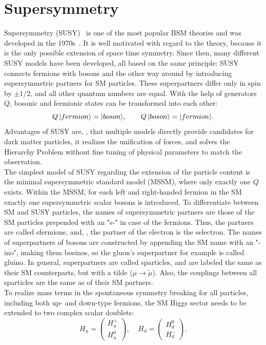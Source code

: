 \section{Supersymmetry}\label{sec:SUSY}
Supersymmetry (SUSY)~\cite{SUSYOriginal,SUSYPrimer} is one of the most popular BSM theories and was developed in the 1970s~\cite{SUSYTheorem,HAAG1975257}. It is well motivated with regard to the theory, because it is the only possible extension of space time symmetry. Since then, many different SUSY models have been developed, all based on the same principle: SUSY connects fermions with bosons and the other way around by introducing supersymmetric partners for SM particles. These superpartners differ only in spin by $\pm1/2$, and all other quantum numbers are equal. With the help of generators $Q$, bosonic and fermionic states can be transformed into each other:
\begin{equation}
 Q\,\lvert fermion\rangle=\lvert boson\rangle,~~~~~~ Q\,\lvert boson\rangle=\lvert fermion\rangle.
\end{equation}
Advantages of SUSY are, \eg, that multiple models directly provide candidates for dark matter particles, it realizes the unification of forces, and solves the Hierarchy Problem without fine tuning of physical parameters to match the observation.\\
The simplest model of SUSY regarding the extension of the particle content is the minimal supersymmetric standard model (MSSM), where only exactly one $Q$ exists. Within the MSSM, for each left and right-handed fermion in the SM exactly one supersymmetric scalar bosons is introduced. To differentiate between SM and SUSY particles, the names of supersymmetric partners are those of the SM particles prepended with an "s-" in case of the fermions. Thus, the partners are called sfermions, and, \eg, the partner of the electron is the selectron. The names of superpartners of bosons are constructed by appending the SM name with an "-ino", making them bosinos, so the gluon's superpartner for example is called gluino. In general, superpartners are called sparticles, and are labeled the same as their SM counterparts, but with a tilde (\eg $\mu \to \widetilde{\mu}$). Also, the couplings between all sparticles are the same as of their SM partners.\\
To realize mass terms in the spontaneous symmetry breaking for all particles, including both up- and down-type fermions, the SM Higgs sector needs to be extended to two complex scalar doublets:
\begin{equation}
 H_u=  \left(
 \begin{matrix}
  H_u^+ \\
  H_u^0
 \end{matrix}
 \right),~~~~~
 H_d=  \left(
 \begin{matrix}
  H_d^0 \\
  H_d^-
 \end{matrix}
 \right).
\end{equation}
